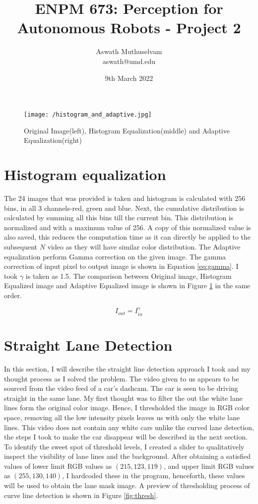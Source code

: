 \documentclass[a4paper, 10pt]{article}
\title{ENPM 673: Perception for Autonomous Robots - Project 2}
\author{Aswath Muthuselvam \\ aswath@umd.edu}
\date{9th March 2022}
\begin{document}
	\maketitle
	
	\begin{figure}[b]
		\centering
		\texttt{[image: /histogram\_and\_adaptive.jpg]}
		\caption{Original Image(left), Histogram Equalization(middle) and Adaptive Equalization(right)}
		\label{fig:HistEQ}
	\end{figure}
	
	\begin{multicols}{2}
		
		\section{Histogram equalization}
		The 24 images that was provided is taken and histogram is calculated with 256 bins, in all 3 channels-red, green and blue. Next, the cumulative distribution is calculated by summing all this bins till the current bin. This distribution is normalized and with a maximum  value of 256. A copy of this normalized value is also saved, this reduces the computation time as it can directly be applied to the subsequent $N$ video as they will have similar color distribution. The Adaptive equalization perform Gamma correction on the given image. The gamma correction of input pixel to output image is shown in Equation \ref{eq:gamma}. I took $\gamma$ is taken as 1.5.  The comparison between Original image, Histogram Equalized image and Adaptive Equalized image is shown in Figure \ref{fig:HistEQ} in the same order.
		
		\begin{equation} \label{eq:gamma}
		I_{out}=I_{in}^{\gamma}
		\end{equation}
		
		\section{Straight Lane Detection}
		In this section, I will describe the straight line detection approach I took and my thought process as I solved the problem. The video given to us appears to be sourced from the video feed of a car's dashcam. The car is seen to be driving straight in the same lane. My first thought was to filter the out the white lane lines form the original color image. Hence, I thresholded the image in RGB color space, removing all the low intensity pixels leaves us with only the white lane lines. This video does not contain any white cars unlike the curved lane detection, the steps I took to make the car disappear will be described in the next section. To identify the sweet spot of threshold levels, I created a slider to qualitatively inspect the visibility of lane lines and the background. After obtaining a satisfied values of lower limit RGB values as $(215, 123, 119)$, and upper limit RGB values as $(255, 130, 140)$, I hardcoded these in the program, henceforth, these values will be used to obtain the lane mask image. A preview of thresholding process of curve line detection is shown in Figure \ref{fig:thresh}. 
		

\end{multicols}
\end{document}
